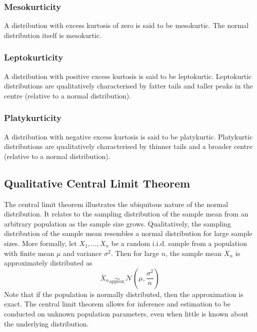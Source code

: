 \documentclass[11pt]{report} %
\begin{document}
\subsubsection{Mesokurticity}

A distribution with excess kurtosis of zero is said to be mesokurtic. The normal distribution itself is mesokurtic.

\subsubsection{Leptokurticity}

A distribution with positive excess kurtosis is said to be leptokurtic. Leptokurtic distributions are qualitatively characterised by fatter tails and taller peaks in the centre (relative to a normal distribution).

\subsubsection{Platykurticity}

A distribution with negative excess kurtosis is said to be platykurtic. Platykurtic distributions are qualitatively characterised by thinner tails and a broader centre (relative to a normal distribution).

\subsection{Qualitative Central Limit Theorem}

The central limit theorem illustrates the ubiquitous nature of the normal distribution. It relates to the sampling distribution of the sample mean from an arbitrary population as the sample size grows. Qualitatively, the sampling distribution of the sample mean resembles a normal distribution for large sample sizes. More formally, let $X_{1}, \dots, X_{n}$ be a random i.i.d. sample from a population with finite mean $\mu$ and variance $\sigma^{2}$. Then for large $n$, the sample mean $\overline{X}_{n}$ is approximately distributed as
\begin{equation}
\overline{X}_{n} \underset{\mathrm{approx.}}{\sim} \mathcal{N}\left(\mu, \dfrac{\sigma^{2}}{n}\right)
\end{equation}
Note that if the population is normally distributed, then the approximation is exact. The central limit theorem allows for inference and estimation to be conducted on unknown population parameters, even when little is known about the underlying distribution.
\end{document}
